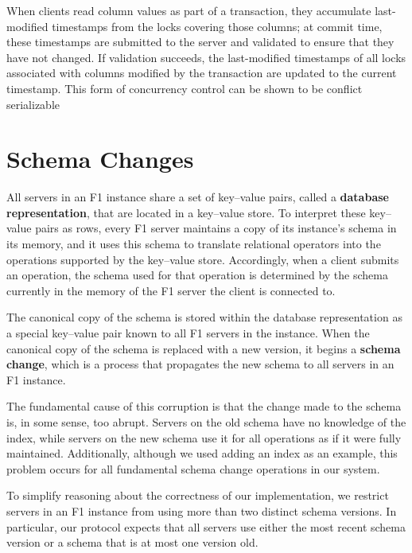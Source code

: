 \documentclass[11pt]{article}
\begin{document}
When clients read column values as part of a transaction, they accumulate last-modified timestamps
from the locks covering those columns; at commit time, these timestamps are submitted to the server
and validated to ensure that they have not changed. If validation succeeds, the last-modified
timestamps of all locks associated with columns modified by the transaction are updated to the current
timestamp. This form of concurrency control can be shown to be conflict serializable
\section{Schema Changes}
\label{sec:org9d625be}
All servers in an F1 instance share a set of key–value pairs, called a \textbf{database representation}, that
are located in a key–value store. To interpret these key–value pairs as rows, every F1 server
maintains a copy of its instance’s schema in its memory, and it uses this schema to translate
relational operators into the operations supported by the key–value store. Accordingly, when a client
submits an operation, the schema used for that operation is determined by the schema currently in the
memory of the F1 server the client is connected to.

The canonical copy of the schema is stored within the database representation as a special key–value
pair known to all F1 servers in the instance. When the canonical copy of the schema is replaced with a
new version, it begins a \textbf{schema change}, which is a process that propagates the new schema to all
servers in an F1 instance.

The fundamental cause of this corruption is that the change made to the schema is, in some sense, too
abrupt. Servers on the old schema have no knowledge of the index, while servers on the new schema use
it for all operations as if it were fully maintained. Additionally, although we used adding an index
as an example, this problem occurs for all fundamental schema change operations in our system.

To simplify reasoning about the correctness of our implementation, we restrict servers in an F1
instance from using more than two distinct schema versions. In particular, our protocol expects that
all servers use either the most recent schema version or a schema that is at most one version old.
\end{document}
